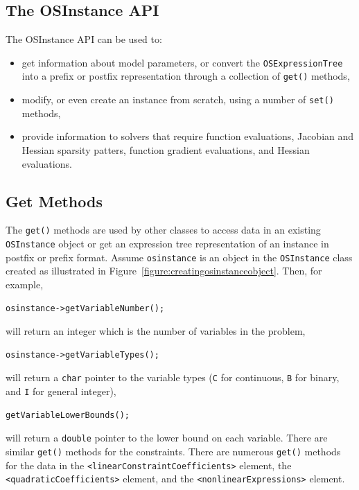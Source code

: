 \documentclass[11pt]{article}
\newcounter{Fig}
\renewcommand{\_}{{\char"5F}}
\renewcommand{\{}{{\char"7B}}
\renewcommand{\}}{{\char"7D}}
\renewcommand{\^}{{\char"0D}}
\renewcommand{\'}{{\char"0D}}
\begin{document}
\begin{enumerate}[Step 1:]
\section{The  OSInstance API}\label{section:osinstanceAPI}

The OSInstance API can be used to:

\begin{itemize}

\item  get information about model parameters, or convert the {\tt OSExpressionTree} into a prefix or postfix
representation through a collection  of {\tt get()} methods,

\item modify, or even create an instance from scratch, using a number of {\tt set()} methods,

\item provide information to solvers that require function evaluations, Jacobian and Hessian sparsity patters,  
function gradient evaluations, and Hessian evaluations.

\end{itemize}



\subsection{Get Methods}

The {\tt get()} methods are used by other classes to access data in an existing {\tt OSInstance} object or get 
an expression tree representation of an instance in postfix or prefix format.   Assume {\tt osinstance} is an 
object in the {\tt OSInstance} class created as illustrated in Figure~\ref{figure:creatingosinstanceobject}. 
Then, for example,
\begin{verbatim}
osinstance->getVariableNumber();
\end{verbatim}
will return an integer which is the number of variables in the problem,
\begin{verbatim}
osinstance->getVariableTypes();
\end{verbatim}
will return a {\tt char} pointer to the variable types ({\tt C} for continuous, {\tt B} for binary, 
and {\tt I} for general integer),
\begin{verbatim}
getVariableLowerBounds();
\end{verbatim}
will  return a {\tt double} pointer to the lower bound on each variable. There are similar {\tt get()} methods 
for the constraints. There are numerous {\tt get()} methods for the data in the {\tt <linearConstraintCoefficients>} 
 element, the {\tt <quadraticCoefficients>} element, and the {\tt <nonlinearExpressions>} element.


\end{enumerate}
\end{document}
